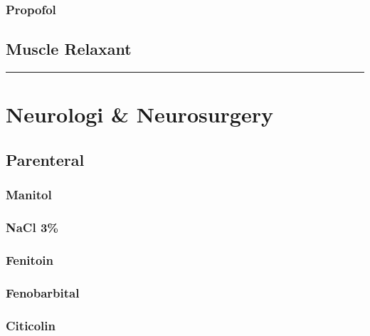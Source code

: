 \documentclass[
]{book}
\begin{document}
\hypertarget{propofol}{%
\subsubsection{Propofol}\label{propofol}}

\hypertarget{muscle-relaxant}{%
\subsection{Muscle Relaxant}\label{muscle-relaxant}}

\begin{center}\rule{0.5\linewidth}{0.5pt}\end{center}

\hypertarget{neurologi-neurosurgery}{%
\section{Neurologi \& Neurosurgery}\label{neurologi-neurosurgery}}

\hypertarget{parenteral-3}{%
\subsection{Parenteral}\label{parenteral-3}}

\hypertarget{manitol}{%
\subsubsection{Manitol}\label{manitol}}

\hypertarget{nacl-3}{%
\subsubsection{NaCl 3\%}\label{nacl-3}}

\hypertarget{fenitoin}{%
\subsubsection{Fenitoin}\label{fenitoin}}

\hypertarget{fenobarbital}{%
\subsubsection{Fenobarbital}\label{fenobarbital}}

\hypertarget{citicolin}{%
\subsubsection{Citicolin}\label{citicolin}}
\end{document}
